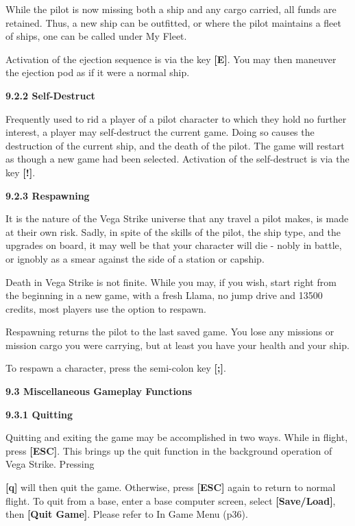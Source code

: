\documentclass{article}
\begin{document}
While the pilot is now missing both a ship and any cargo carried, all funds are retained. Thus, a new ship can be outfitted, or where the pilot maintains a fleet of ships, one can be called under My Fleet. 

Activation of the ejection sequence is via the key \textbf{[E]}. You may then maneuver the ejection pod as if it were a normal ship. 



\textbf{9.2.2 Self-Destruct }

Frequently used to rid a player of a pilot character to which they hold no further interest, a player may self-destruct the current game. Doing so causes the destruction of the current ship, and the death of the pilot. The game will restart as though a new game had been selected. Activation of the self-destruct is via the key \textbf{[!]}. 

\textbf{9.2.3 Respawning }

It is the nature of the Vega Strike universe that any travel a pilot makes, is made at their own risk. Sadly, in spite of the skills of the pilot, the ship type, and the upgrades on board, it may well be that your character will die - nobly in battle, or ignobly as a smear against the side of a station or capship. 

Death in Vega Strike is not finite. While you may, if you wish, start right from the beginning in a new game, with a fresh Llama, no jump drive and 13500 credits, most players use the option to respawn. 

Respawning returns the pilot to the last saved game. You lose any missions or mission cargo you were carrying, but at least you have your health and your ship. 

To respawn a character, press the semi-colon key \textbf{[;]}. 

\textbf{}

\textbf{9.3 Miscellaneous Gameplay Functions }

\textbf{9.3.1 Quitting }

Quitting and exiting the game may be accomplished in two ways. While in flight, press \textbf{[ESC]}. This brings up the quit function in the background operation of Vega Strike. Pressing 

\textbf{[q] }will then quit the game. Otherwise, press \textbf{[ESC] }again to return to normal flight. To quit from a base, enter a base computer screen, select \textbf{[Save/Load]}, then \textbf{[Quit Game]}. Please refer to In Game Menu (p36). 
\end{document}
